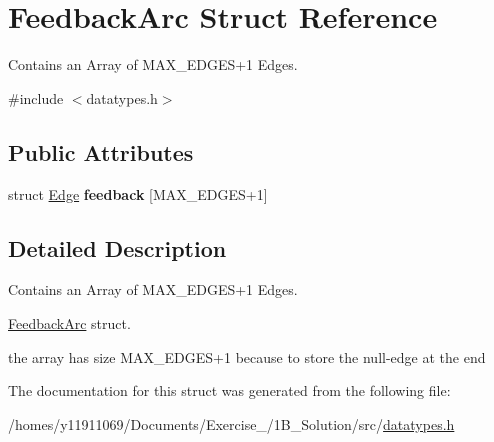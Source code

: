 \hypertarget{structFeedbackArc}{\section{Feedback\-Arc Struct Reference}
\label{structFeedbackArc}
}


Contains an Array of M\-A\-X\-\_\-\-E\-D\-G\-E\-S+1 Edges.  




{\ttfamily \#include $<$datatypes.\-h$>$}

\subsection*{Public Attributes}
\begin{DoxyCompactItemize}
\item 
\hypertarget{structFeedbackArc_aad10f32fe8cc9b287dbcdcd332c7459e}{struct \hyperlink{structEdge}{Edge} {\bfseries feedback} \mbox{[}M\-A\-X\-\_\-\-E\-D\-G\-E\-S+1\mbox{]}}\label{structFeedbackArc_aad10f32fe8cc9b287dbcdcd332c7459e}

\end{DoxyCompactItemize}


\subsection{Detailed Description}
Contains an Array of M\-A\-X\-\_\-\-E\-D\-G\-E\-S+1 Edges. 

\hyperlink{structFeedbackArc}{Feedback\-Arc} struct.

the array has size M\-A\-X\-\_\-\-E\-D\-G\-E\-S+1 because to store the null-\/edge at the end 

The documentation for this struct was generated from the following file\-:\begin{DoxyCompactItemize}
\item 
/homes/y11911069/\-Documents/\-Exercise\-\_/1\-B\-\_\-\-Solution/src/\hyperlink{datatypes_8h}{datatypes.\-h}\end{DoxyCompactItemize}
